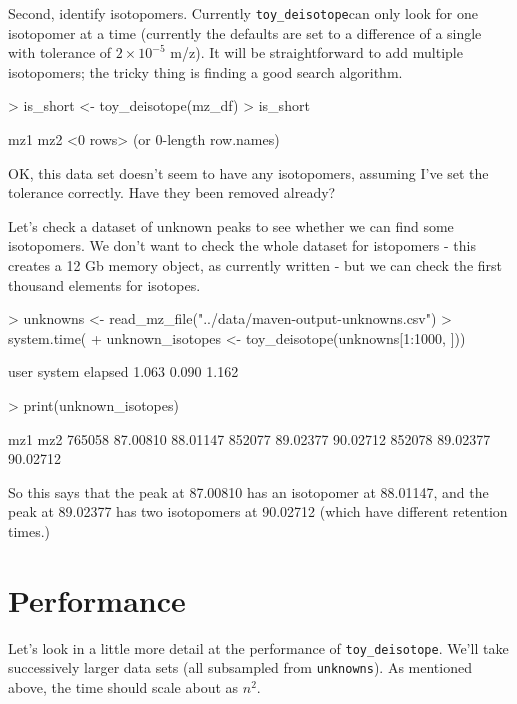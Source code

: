 \documentclass{article}
\newcommand{\toydeisotope}{\texttt{toy\_deisotope}}
\begin{document}
Second, identify isotopomers. Currently \toydeisotope can only look for one isotopomer at a time (currently the defaults are set to a difference of a single  with tolerance of $2 \times 10^{-5}$ m/z). It will be straightforward to add multiple isotopomers; the tricky thing is finding a good search algorithm.

\begin{Schunk}
\begin{Sinput}
> is_short <- toy_deisotope(mz_df)
> is_short
\end{Sinput}
\begin{Soutput}
[1] mz1 mz2
<0 rows> (or 0-length row.names)
\end{Soutput}
\end{Schunk}
OK, this data set doesn't seem to have any isotopomers, assuming I've set the tolerance correctly. Have they been removed already?

Let's check a dataset of unknown peaks to see whether we can find some isotopomers. We don't want to check the whole dataset for istopomers - this creates a 12 Gb memory object, as currently written - but we can check the first thousand elements for isotopes.

\begin{Schunk}
\begin{Sinput}
> unknowns <- read_mz_file("../data/maven-output-unknowns.csv")
> system.time({
+   unknown_isotopes <- toy_deisotope(unknowns[1:1000, ])})
\end{Sinput}
\begin{Soutput}
   user  system elapsed 
  1.063   0.090   1.162 
\end{Soutput}
\begin{Sinput}
> print(unknown_isotopes)
\end{Sinput}
\begin{Soutput}
            mz1      mz2
765058 87.00810 88.01147
852077 89.02377 90.02712
852078 89.02377 90.02712
\end{Soutput}
\end{Schunk}

So this says that the peak at 87.00810 has an isotopomer at 88.01147, and the peak at 89.02377 has two isotopomers at 90.02712 (which have different retention times.)

\section{Performance}

Let's look in a little more detail at the performance of \toydeisotope. We'll take successively larger data sets (all subsampled from \texttt{unknowns}). As mentioned above, the time should scale about as $n^2$.
\end{document}
